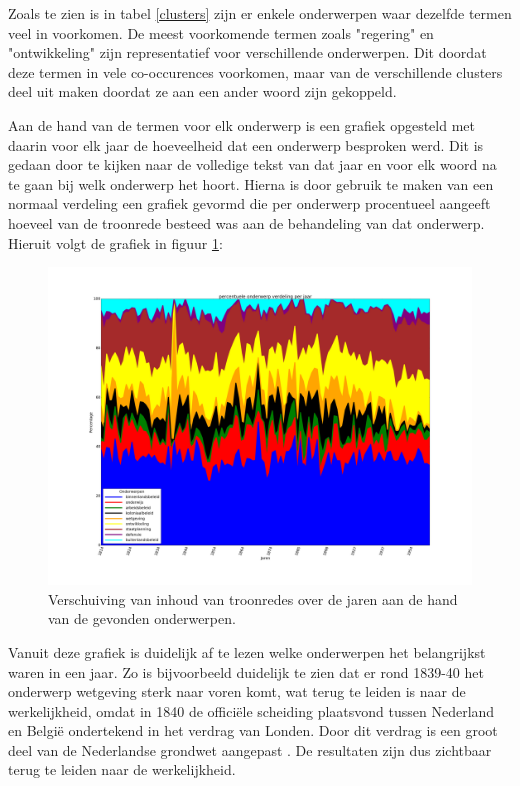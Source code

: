Zoals te zien is in tabel \ref{clusters} zijn er enkele onderwerpen waar dezelfde termen veel in voorkomen. De meest voorkomende termen zoals "regering" en "ontwikkeling" zijn representatief voor verschillende onderwerpen. Dit doordat deze termen in vele co-occurences voorkomen, maar van de verschillende clusters deel uit maken doordat ze aan een ander woord zijn gekoppeld.

Aan de hand van de termen voor elk onderwerp is een grafiek opgesteld met daarin voor elk jaar de hoeveelheid dat een onderwerp besproken werd. Dit is gedaan door te kijken naar de volledige tekst van dat jaar en voor elk woord na te gaan bij welk onderwerp het hoort. Hierna is door gebruik te maken van een normaal verdeling een grafiek gevormd die per onderwerp procentueel aangeeft hoeveel van de troonrede besteed was aan de behandeling van dat onderwerp. Hieruit volgt de grafiek in figuur \ref{onderwerpverdeling}: 

\begin{figure}[H]
\hfill\includegraphics[width=1.2\textwidth,left]{fig/onderwerpverdeling2}
\caption{\label{onderwerpverdeling} Verschuiving van inhoud van troonredes over de jaren aan de hand van de gevonden onderwerpen.}
\end{figure}

Vanuit deze grafiek is duidelijk af te lezen welke onderwerpen het belangrijkst waren in een jaar. Zo is bijvoorbeeld duidelijk te zien dat er rond 1839-40 het onderwerp wetgeving sterk naar voren komt, wat terug te leiden is naar de werkelijkheid, omdat in 1840 de officiële scheiding plaatsvond tussen Nederland en België ondertekend in het verdrag van Londen. Door dit verdrag is een groot deel van de Nederlandse grondwet aangepast \citep{schroeder1996transformation}. De resultaten zijn dus zichtbaar terug te leiden naar de werkelijkheid.